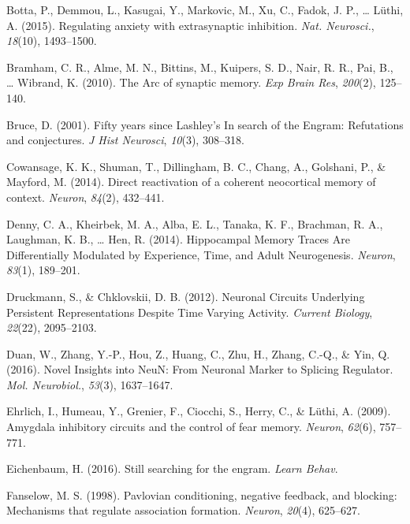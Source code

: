 \documentclass[12pt,a4paperpaper,]{report}
\begin{document}
\hypertarget{ref-bottaux5fregulatingux5f2015}{}
Botta, P., Demmou, L., Kasugai, Y., Markovic, M., Xu, C., Fadok, J. P.,
\ldots{} Lüthi, A. (2015). Regulating anxiety with extrasynaptic
inhibition. \emph{Nat. Neurosci.}, \emph{18}(10), 1493--1500.

\hypertarget{ref-bramhamux5farcux5f2010}{}
Bramham, C. R., Alme, M. N., Bittins, M., Kuipers, S. D., Nair, R. R.,
Pai, B., \ldots{} Wibrand, K. (2010). The Arc of synaptic memory.
\emph{Exp Brain Res}, \emph{200}(2), 125--140.

\hypertarget{ref-bruceux5ffiftyux5f2001}{}
Bruce, D. (2001). Fifty years since Lashley's In search of the Engram:
Refutations and conjectures. \emph{J Hist Neurosci}, \emph{10}(3),
308--318.

\hypertarget{ref-cowansageux5fdirectux5f2014}{}
Cowansage, K. K., Shuman, T., Dillingham, B. C., Chang, A., Golshani,
P., \& Mayford, M. (2014). Direct reactivation of a coherent neocortical
memory of context. \emph{Neuron}, \emph{84}(2), 432--441.

\hypertarget{ref-dennyux5fhippocampalux5f2014}{}
Denny, C. A., Kheirbek, M. A., Alba, E. L., Tanaka, K. F., Brachman, R.
A., Laughman, K. B., \ldots{} Hen, R. (2014). Hippocampal Memory Traces
Are Differentially Modulated by Experience, Time, and Adult
Neurogenesis. \emph{Neuron}, \emph{83}(1), 189--201.

\hypertarget{ref-druckmannux5fneuronalux5f2012}{}
Druckmann, S., \& Chklovskii, D. B. (2012). Neuronal Circuits Underlying
Persistent Representations Despite Time Varying Activity. \emph{Current
Biology}, \emph{22}(22), 2095--2103.

\hypertarget{ref-duanux5fnovelux5f2016}{}
Duan, W., Zhang, Y.-P., Hou, Z., Huang, C., Zhu, H., Zhang, C.-Q., \&
Yin, Q. (2016). Novel Insights into NeuN: From Neuronal Marker to
Splicing Regulator. \emph{Mol. Neurobiol.}, \emph{53}(3), 1637--1647.

\hypertarget{ref-ehrlichux5famygdalaux5f2009}{}
Ehrlich, I., Humeau, Y., Grenier, F., Ciocchi, S., Herry, C., \& Lüthi,
A. (2009). Amygdala inhibitory circuits and the control of fear memory.
\emph{Neuron}, \emph{62}(6), 757--771.

\hypertarget{ref-eichenbaumux5fstillux5f2016}{}
Eichenbaum, H. (2016). Still searching for the engram. \emph{Learn
Behav}.

\hypertarget{ref-fanselowux5fpavlovianux5f1998}{}
Fanselow, M. S. (1998). Pavlovian conditioning, negative feedback, and
blocking: Mechanisms that regulate association formation. \emph{Neuron},
\emph{20}(4), 625--627.
\end{document}

